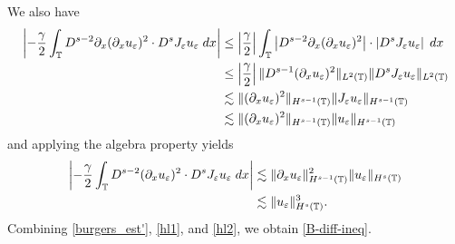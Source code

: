 %
%
We also have
\begin{equation}
\begin{split}
\left |- \frac{\gamma}{2} \int_{\mathbb{T}} D^{s-2} \partial_x (\partial_x u_\varepsilon)^2 \cdot
D^s J_\varepsilon u_\varepsilon \; dx \right |
& \le \left | \frac{\gamma}{2} \right | \int_{\mathbb{T}} \left | D^{s-2} \partial_x (\partial_x u_\varepsilon)^2 \right |
\cdot \left |D^s J_\varepsilon u_\varepsilon \right | \; dx
\\
& \le \left | \frac{\gamma}{2} \right |
\| D^{s-1} (\partial_x u_\varepsilon)^2 \|_{L^2(\mathbb{T})}
\| D^s J_\varepsilon u_\varepsilon \|_{L^2(\mathbb{T})}
\\
& \lesssim \|(\partial_x u_\varepsilon)^2 \|_{H^{s-1}(\mathbb{T})}
\| J_\varepsilon u_\varepsilon \|_{H^{s-1}(\mathbb{T})} 
\\
& \lesssim \|(\partial_x u_\varepsilon)^2 \|_{H^{s-1}(\mathbb{T})} \| u_\varepsilon \|_{H^{s-1}(\mathbb{T})} 
\end{split}
\end{equation}
and applying the algebra property yields
\begin{equation}
\label{hl2}
\begin{split}
\left | - \frac{\gamma}{2} \int_{\mathbb{T}} D^{s-2} (\partial_x u_\varepsilon)^2 \cdot
D^s J_\varepsilon u_\varepsilon \; dx \right |
& \lesssim \| \partial_x u_\varepsilon \|_{H^{s-1}(\mathbb{T})}^2 \| u_\varepsilon \|_{H^s(\mathbb{T})} 
\\
& \lesssim \|u_\varepsilon\|_{H^s(\mathbb{T})}^3.
\end{split}
\end{equation}
%
Combining \eqref{burgers_est'}, \eqref{hl1}, and \eqref{hl2}, we obtain
\eqref{B-diff-ineq}.
%  
% 
%
%
%   
%
\noindent
